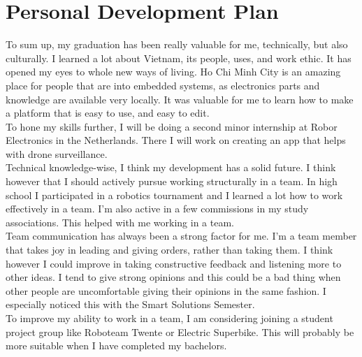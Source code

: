 \documentclass[11pt, a4paper]{article}
\begin{document}
\newpage
\section{Personal Development Plan}
To sum up, my graduation has been really valuable for me, technically, but also culturally. I learned a lot about Vietnam, its people, uses, and work ethic. It has opened my eyes to whole new ways of living. Ho Chi Minh City is an amazing place for people that are into embedded systems, as electronics parts and knowledge are available very locally. It was valuable for me to learn how to make a platform that is easy to use, and easy to edit.\\

To hone my skills further, I will be doing a second minor internship at Robor Electronics in the Netherlands. There I will work on creating an app that helps with drone surveillance.\\

Technical knowledge-wise, I think my development has a solid future. I think however that I should actively pursue working structurally in a team. In high school I participated in a robotics tournament and I learned a lot how to work effectively in a team. I'm also active in a few commissions in my study associations. This helped with me working in a team.\\

Team communication has always been a strong factor for me. I'm a team member that takes joy in leading and giving orders, rather than taking them. I think however I could improve in taking constructive feedback and listening more to other ideas. I tend to give strong opinions and this could be a bad thing when other people are uncomfortable giving their opinions in the same fashion. I especially noticed this with the Smart Solutions Semester.\\

To improve my ability to work in a team, I am considering joining a student project group like Roboteam Twente or Electric Superbike. This will probably be more suitable when I have completed my bachelors.

\newpage
\printbibliography
\end{document}
